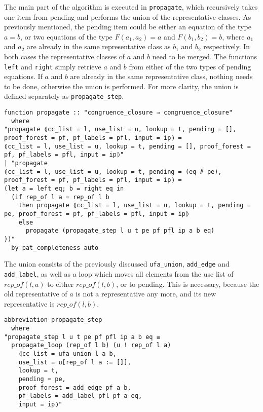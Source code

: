 The main part of the algorithm is executed in \lstinline{propagate}, which recursively takes one item from pending and performs the union of the representative classes. As previously mentioned, the pending item could be either an equation of the type $a = b$, or two equations of the type $F(a_1, a_2) = a$ and $F(b_1, b_2) = b$, where $a_1$ and $a_2$ are already in the same representative class as $b_1$ and $b_2$ respectively. In both cases the representative classes of $a$ and $b$ need to be merged. The functions \lstinline{left} and \lstinline{right} simply retrieve $a$ and $b$ from either of the two types of pending equations. If $a$ and $b$ are already in the same representative class, nothing needs to be done, otherwise the union is performed. For more clarity, the union is defined separately as \lstinline{propagate_step}.

\begin{lstlisting}
function propagate :: "congruence_closure ⇒ congruence_closure"
  where
"propagate ⦇cc_list = l, use_list = u, lookup = t, pending = [], proof_forest = pf, pf_labels = pfl, input = ip⦈ =
⦇cc_list = l, use_list = u, lookup = t, pending = [], proof_forest = pf, pf_labels = pfl, input = ip⦈"
| "propagate
⦇cc_list = l, use_list = u, lookup = t, pending = (eq # pe), proof_forest = pf, pf_labels = pfl, input = ip⦈ =
(let a = left eq; b = right eq in
  (if rep_of l a = rep_of l b
    then propagate ⦇cc_list = l, use_list = u, lookup = t, pending = pe, proof_forest = pf, pf_labels = pfl, input = ip⦈
    else
      propagate (propagate_step l u t pe pf pfl ip a b eq)
))"
  by pat_completeness auto
\end{lstlisting}

The union consists of the previously discussed \lstinline{ufa_union}, \lstinline{add_edge} and \lstinline{add_label}, as well as a loop which moves all elements from the use list of $rep\_of(l,a)$ to either $rep\_of(l, b)$, or to pending. This is necessary, because the old representative of $a$ is not a representative any more, and its new representative is  $rep\_of(l, b)$.

\begin{lstlisting}
abbreviation propagate_step
  where
"propagate_step l u t pe pf pfl ip a b eq ≡
  propagate_loop (rep_of l b) (u ! rep_of l a)
    ⦇cc_list = ufa_union l a b,
    use_list = u[rep_of l a := []],
    lookup = t,
    pending = pe,
    proof_forest = add_edge pf a b,
    pf_labels = add_label pfl pf a eq,
    input = ip⦈"
\end{lstlisting}


